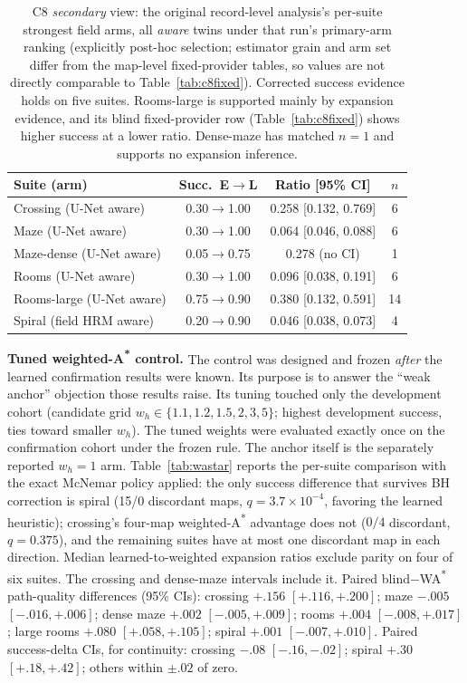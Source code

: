 \documentclass[letterpaper]{article} %
\newcommand{\stage}[1]{\textsc{#1}}
\begin{document}
\begin{table}[t]
\centering
\small
\setlength{\tabcolsep}{2.3pt}
\begin{tabular}{@{}lccc@{}}
\toprule
Suite (arm) & Succ.\ E$\to$L & Ratio [95\% CI] & $n$ \\
\midrule
Crossing (U-Net aware) & 0.30$\to$1.00 & 0.258 [0.132, 0.769] & 6 \\
Maze (U-Net aware) & 0.30$\to$1.00 & 0.064 [0.046, 0.088] & 6 \\
Maze-dense (U-Net aware) & 0.05$\to$0.75 & 0.278 (no CI) & 1 \\
Rooms (U-Net aware) & 0.30$\to$1.00 & 0.096 [0.038, 0.191] & 6 \\
Rooms-large (U-Net aware) & 0.75$\to$0.90 & 0.380 [0.132, 0.591] & 14 \\
Spiral (field HRM aware) & 0.20$\to$0.90 & 0.046 [0.038, 0.073] & 4 \\
\bottomrule
\end{tabular}
\caption{\stage{C8} \emph{secondary} view: the original record-level analysis's per-suite strongest field arms, all \emph{aware} twins under that run's primary-arm ranking (explicitly post-hoc selection; estimator grain and arm set differ from the map-level fixed-provider tables, so values are not directly comparable to Table~\ref{tab:c8fixed}). Corrected success evidence holds on five suites. Rooms-large is supported mainly by expansion evidence, and its blind fixed-provider row (Table~\ref{tab:c8fixed}) shows higher success at a lower ratio. Dense-maze has matched $n{=}1$ and supports no expansion inference.}
\label{tab:c8}
\end{table}

\textbf{Tuned weighted-A\textsuperscript{*} control.} The control was designed and frozen \emph{after} the learned confirmation results were known. Its purpose is to answer the ``weak anchor'' objection those results raise. Its tuning touched only the development cohort (candidate grid $w_h \in \{1.1, 1.2, 1.5, 2, 3, 5\}$; highest development success, ties toward smaller $w_h$). The tuned weights were evaluated exactly once on the confirmation cohort under the frozen rule. The anchor itself is the separately reported $w_h{=}1$ arm. Table~\ref{tab:wastar} reports the per-suite comparison with the exact McNemar policy applied: the only success difference that survives BH correction is spiral (15/0 discordant maps, $q{=}3.7{\times}10^{-4}$, favoring the learned heuristic); crossing's four-map weighted-A\textsuperscript{*} advantage does not ($0/4$ discordant, $q{=}0.375$), and the remaining suites have at most one discordant map in each direction. Median learned-to-weighted expansion ratios exclude parity on four of six suites. The crossing and dense-maze intervals include it. Paired blind$-$WA\textsuperscript{*} path-quality differences (95\% CIs): crossing $+.156$ $[+.116,+.200]$; maze $-.005$ $[-.016,+.006]$; dense maze $+.002$ $[-.005,+.009]$; rooms $+.004$ $[-.008,+.017]$; large rooms $+.080$ $[+.058,+.105]$; spiral $+.001$ $[-.007,+.010]$. Paired success-delta CIs, for continuity: crossing $-.08$ $[-.16,-.02]$; spiral $+.30$ $[+.18,+.42]$; others within $\pm.02$ of zero.
\end{document}
